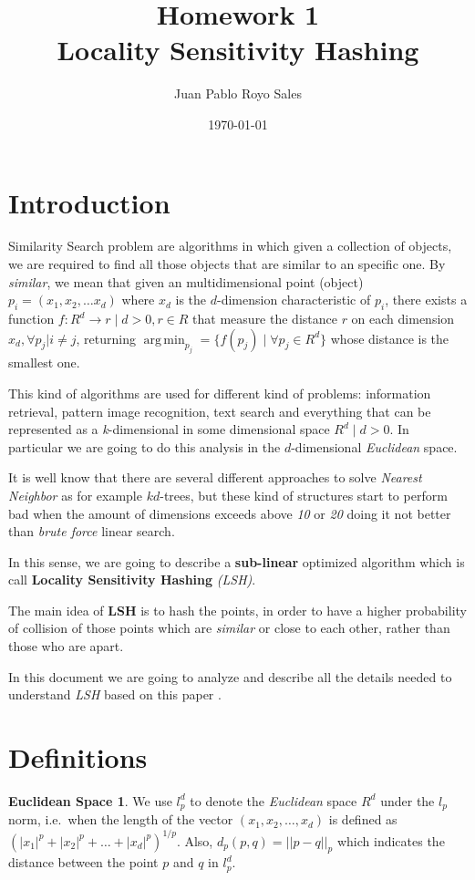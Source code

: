 \documentclass[12pt, a4paper]{article}
\title{%
      Homework 1 \\
      Locality Sensitivity Hashing
    }
\author{Juan Pablo Royo Sales}
\date\today
\DeclareMathOperator*{\argmin}{arg\,min}
\theoremstyle{definition}
\newtheorem*{euclidean}{Euclidean Space}
\begin{document}
\maketitle

\section{Introduction}
Similarity Search problem are algorithms in which given a collection of objects, we are required to find all those objects that are similar to an specific one. By \textit{similar}, we mean that given an multidimensional point (object) $p_i = (x_1, x_2, \dots x_d)$ where $x_d$ is the $d$-dimension characteristic of $p_i$, there exists a function $f: R^d \to r \mid d > 0, r \in R$ that measure the distance $r$ on each dimension $x_d, \forall p_j | i \neq j$, returning $\argmin_{p_j} = \{ f(p_j) \mid \forall p_j \in R^d \}$ whose distance is the smallest one.

This kind of algorithms are used for different kind of problems: information retrieval, pattern image recognition, text search and everything that can be represented as a \textit{k}-dimensional in some dimensional space $R^d \mid d > 0$. In particular we are going to do this analysis in the $d$-dimensional \textit{Euclidean} space.

It is well know that there are several different approaches to solve \textit{Nearest Neighbor} as for example $kd$-trees, but these kind of structures start to perform bad when the amount of dimensions exceeds above \textit{10} or \textit{20} doing it not better than \textit{brute force} linear search.

In this sense, we are going to describe a \textbf{sub-linear} optimized algorithm which is call \textbf{Locality Sensitivity Hashing} \textit{(LSH)}.

The main idea of \textbf{LSH} is to hash the points, in order to have a higher probability of collision of those points which are \textit{similar} or close to each other, rather than those who are apart.

In this document we are going to analyze and describe all the details needed to understand \textit{LSH} based on this paper \cite{gionis_sim_search}.

\section{Definitions}

\begin{euclidean}
  We use $l^{d}_p$ to denote the \textit{Euclidean} space $R^d$ under the $l_p$ norm, i.e.\ when the length of the vector $(x_1, x_2, \dots, x_d)$ is defined as $(|x_1|^p + |x_2|^p + \dots + |x_d|^p)^{1/p}$. Also, $d_p(p,q) = || p - q ||_p$ which indicates the distance between the point $p$ and $q$ in $l^{d}_p$.
\end{euclidean}
\end{document}
